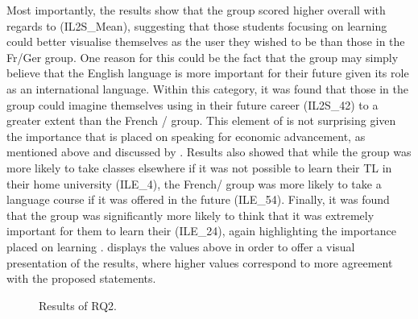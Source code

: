 \documentclass[output=paper]{langsci/langscibook}
\begin{document}
Most importantly, the results show that the  group scored higher overall with regards to  (IL2S\_Mean), suggesting that those students focusing on learning  could better visualise themselves as the  user they wished to be than those in the Fr/Ger group. One reason for this could be the fact that the  group may simply believe that the English language is more important for their future given its role as an international language. Within this category, it was found that those in the  group could imagine themselves using  in their future career (IL2S\_42) to a greater extent than the French / group. This element of  is not surprising given the importance that is placed on speaking  for economic advancement, as mentioned above and discussed by \citet{BlockCameron2002}. Results also showed that while the  group was more likely to take classes elsewhere if it was not possible to learn their TL in their home university (ILE\_4), the French/ group was more likely to take a language course if it was offered in the future (ILE\_54). Finally, it was found that the  group was significantly more likely to think that it was extremely important for them to learn their  (ILE\_24), again highlighting the importance placed on learning .  displays the values above in order to offer a visual presentation of the results, where higher values correspond to more agreement with the proposed statements.

\begin{figure}  

\caption{{Results of RQ2.}}
\label{fig:geoghegan:graph3}
\end{figure}
\end{document}
